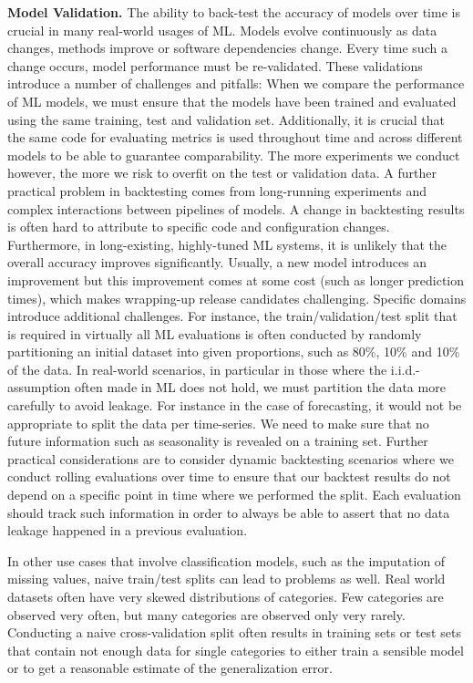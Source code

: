 \documentclass[11pt]{article}
\newcommand{\hdr}[1]{\noindent\textbf{#1.}}
\begin{document}
\hdr{Model Validation} The ability to back-test the accuracy of models over time is crucial in many real-world usages of ML. Models evolve continuously as data changes, methods improve or software dependencies change. Every time such a change occurs, model performance must be re-validated. These validations introduce a number of challenges and pitfalls: When we compare the performance of ML models, we must ensure that the models have been trained and evaluated using the same training, test and validation set. Additionally, it is crucial that the same code for evaluating metrics is used throughout time and across different models to be able to guarantee comparability. The more experiments we conduct however, the more we risk to overfit on the test or validation data.
%
A further practical problem in backtesting comes from long-running experiments and complex interactions between pipelines of models. A change in backtesting results is often hard to attribute to specific code and configuration changes. Furthermore, in long-existing, highly-tuned ML systems, it is unlikely that the overall accuracy improves significantly. Usually, a new model introduces an improvement but this improvement comes at some cost (such as longer prediction times), which makes wrapping-up release candidates challenging.
%
Specific domains introduce additional challenges. For instance, the train/validation/test split that is required in virtually all ML evaluations is often conducted by randomly partitioning an initial dataset into given proportions, such as 80\%, 10\% and 10\% of the data. In real-world scenarios, in particular in those where the i.i.d.-assumption often made in ML does not hold, we must partition the data more carefully to avoid leakage. For instance in the case of forecasting, it would not be appropriate to split the data per time-series. We need to make sure that no future information such as seasonality is revealed on a training set. Further practical considerations are to consider dynamic backtesting scenarios where we conduct rolling evaluations over time to ensure that our backtest results do not depend on a specific point in time where we performed the split. Each evaluation should track such information in order to always be able to assert that no data leakage happened in a previous evaluation.

In other use cases that involve classification models, such as the imputation of missing values, naive train/test splits can lead to problems as well. Real world datasets often have very skewed distributions of categories. Few categories are observed very often, but many categories are observed only very rarely. Conducting a naive cross-validation split often results in training sets or test sets that contain not enough data for single categories to either train a sensible model or to get a reasonable estimate of the generalization error. 
\end{document}
